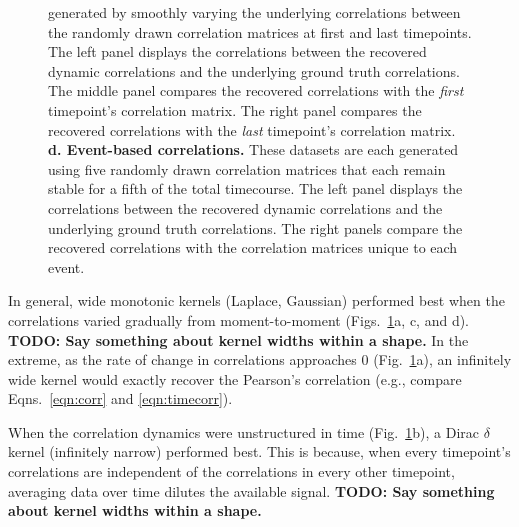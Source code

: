 \documentclass[english]{article}
\begin{document}
\begin{figure}[tp]
{    generated by smoothly varying the underlying correlations between
    the randomly drawn correlation matrices at first and last
    timepoints.  The left panel displays the correlations between the
    recovered dynamic correlations and the underlying ground truth
    correlations.  The middle panel compares the recovered
    correlations with the \textit{first} timepoint's correlation
    matrix.  The right panel compares the recovered correlations with
    the \textit{last} timepoint's correlation matrix.
    \textbf{d. Event-based correlations.}  These datasets are each
    generated using five randomly drawn correlation matrices that each
    remain stable for a fifth of the total timecourse.  The left panel
    displays the correlations between the recovered dynamic
    correlations and the underlying ground truth correlations.  The
    right panels compare the recovered correlations with the
    correlation matrices unique to each event.}
  \label{fig:synthetic}
\end{figure}

In general, wide monotonic kernels (Laplace, Gaussian) performed best
when the correlations varied gradually from moment-to-moment
(Figs.~\ref{fig:synthetic}a, c, and d).  \textbf{TODO: Say something
  about kernel widths within a shape.}  In the extreme, as the rate of
change in correlations approaches 0 (Fig.~\ref{fig:synthetic}a), an
infinitely wide kernel would exactly recover the Pearson's correlation
(e.g., compare Eqns.~\ref{eqn:corr} and \ref{eqn:timecorr}).

When the correlation dynamics were unstructured in time
(Fig.~\ref{fig:synthetic}b), a Dirac $\delta$ kernel (infinitely
narrow) performed best.  This is because, when every timepoint's
correlations are independent of the correlations in every other
timepoint, averaging data over time dilutes the available signal.
\textbf{TODO: Say something about kernel widths within a shape.}
\end{document}

